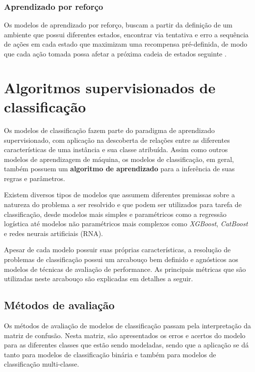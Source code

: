 \subsubsection{Aprendizado por reforço}

Os modelos de aprendizado por reforço, buscam a partir da definição de um ambiente que possui diferentes estados, encontrar via tentativa e erro a sequência de ações em cada estado que maximizam uma recompensa pré-definida, de modo que cada ação tomada possa afetar a próxima cadeia de estados seguinte \cite{bishopPatternRecognitionMachine2006}.



\section{Algoritmos supervisionados de classificação} 
\label{secao:algoritmos-classificacao}

Os modelos de classificação fazem parte do paradigma de aprendizado supervisionado, com aplicação na descoberta de relações entre as diferentes características de uma instância e sua classe atribuída. Assim como outros modelos de aprendizagem de máquina, os modelos de classificação, em geral, também possuem um \textbf{algoritmo de aprendizado} para a inferência de suas regras e parâmetros.

Existem diversos tipos de modelos que assumem diferentes premissas sobre a natureza do problema a ser resolvido e que podem ser utilizados para tarefa de classificação, desde modelos mais simples e paramétricos como a regressão logística até modelos não paramétricos mais complexos como \textit{XGBoost}, \textit{CatBoost} e redes neurais artificiais (RNA).

Apesar de cada modelo possuir suas próprias características, a resolução de problemas de classificação possui um arcabouço bem definido e agnósticos aos modelos de técnicas de avaliação de performance. As principais métricas que são utilizadas neste arcabouço são explicadas em detalhes a seguir.

\subsection{Métodos de avaliação}

Os métodos de avaliação de modelos de classificação passam pela interpretação da matriz de confusão. Nesta matriz, são apresentados os erros e acertos do modelo para as diferentes classes que estão sendo modeladas, sendo que a aplicação se dá tanto para modelos de classificação binária e também para modelos de classificação multi-classe.

